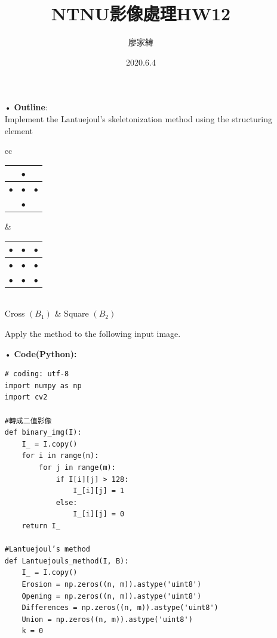 \documentclass[12pt,a4paper]{article}
\title{NTNU影像處理HW12}
\author{廖家緯}
\date{2020.6.4}
\begin{document}
\maketitle
\fontsize{12pt}{20pt}\selectfont
\setlength{\baselineskip}{20pt}

\pagestyle{fancy}
\lhead{}
\chead{}
\rhead{}
\lfoot{}
\cfoot{\thepage}
\rfoot{}
\renewcommand{\headrulewidth}{0pt} %
\renewcommand{\footrulewidth}{0pt} %




\begin{enumerate}
\item[•]{\bf Outline}:\\
Implement the Lantuejoul's skeletonization method 
using the structuring element
\begin{center}
\begin{tabular}{cc}
\begin{tabular}{|c|c|c|}
\hline
 & $\bullet$ &\\
\hline
$\bullet$ & $\bullet$ & $\bullet$\\
\hline
 & $\bullet$ &\\
\hline
\end{tabular}
&
\begin{tabular}{|c|c|c|}
\hline
$\bullet$ & $\bullet$ & $\bullet$\\
\hline
$\bullet$ & $\bullet$ & $\bullet$\\
\hline
$\bullet$ & $\bullet$ & $\bullet$\\
\hline
\end{tabular}\\
Cross $(B_1)$ & Square $(B_2)$
\end{tabular}
\end{center}




Apply the method to the following input image.\\


\item[•]
{\bf Code(Python):}
\begin{lstlisting}
# coding: utf-8
import numpy as np
import cv2

#轉成二值影像
def binary_img(I):
    I_ = I.copy()
    for i in range(n):
        for j in range(m):
            if I[i][j] > 128:
                I_[i][j] = 1
            else:
                I_[i][j] = 0
    return I_

#Lantuejoul’s method
def Lantuejouls_method(I, B):
    I_ = I.copy()
    Erosion = np.zeros((n, m)).astype('uint8')
    Opening = np.zeros((n, m)).astype('uint8')
    Differences = np.zeros((n, m)).astype('uint8')
    Union = np.zeros((n, m)).astype('uint8')
    k = 0


\end{lstlisting}
\end{enumerate}
\end{document}
